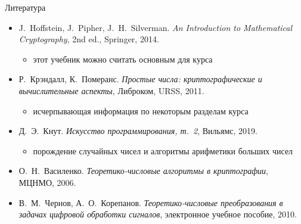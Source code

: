 \documentclass{ca-slides}
\begin{document}
\begin{canvasframe}{Литература}
  \small
  \begin{itemize}
    \item J.~Hoffstein, J.~Pipher, J.~H.~Silverman. \emph{An Introduction to Mathematical
      Cryptography}, 2nd ed., Springer, 2014.
    \begin{itemize}
      \item этот учебник можно считать основным для курса
    \end{itemize}
    \item Р.~Крэндалл, К.~Померанс. \emph{Простые числа: криптографические и вычислительные
      аспекты}, Либроком, URSS, 2011.
    \begin{itemize}
      \item исчерпывающая информация по некоторым разделам курса
    \end{itemize}
    \item Д.~Э.~Кнут. \emph{Искусство программирования, т.~2}, Вильямс, 2019.
    \begin{itemize}
      \item порождение случайных чисел и алгоритмы арифметики больших чисел
    \end{itemize}
    \item О.~Н.~Василенко. \emph{Теоретико-числовые алгоритмы в криптографии}, МЦНМО, 2006.
    \item В.~М.~Чернов, А.~О.~Корепанов. \emph{Теоретико-числовые преобразования в задачах
      цифровой обработки сигналов}, электронное учебное пособие, 2010.
  \end{itemize}
\end{canvasframe}
\end{document}
